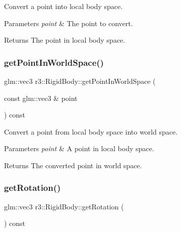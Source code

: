 Convert a point into local body space. 


\begin{DoxyParams}{Parameters}
{\em point} & The point to convert. \\
\hline
\end{DoxyParams}
\begin{DoxyReturn}{Returns}
The point in local body space. 
\end{DoxyReturn}
\mbox{\label{classr3_1_1_rigid_body_a1d694ab55e5846af2d5a184b2be4c523}} 
\subsubsection{\texorpdfstring{get\+Point\+In\+World\+Space()}{getPointInWorldSpace()}}
{\footnotesize\ttfamily glm\+::vec3 r3\+::\+Rigid\+Body\+::get\+Point\+In\+World\+Space (\begin{DoxyParamCaption}\item[{const glm\+::vec3 \&}]{point }\end{DoxyParamCaption}) const}



Convert a point from local body space into world space. 


\begin{DoxyParams}{Parameters}
{\em point} & A point in local body space. \\
\hline
\end{DoxyParams}
\begin{DoxyReturn}{Returns}
The converted point in world space. 
\end{DoxyReturn}
\mbox{\label{classr3_1_1_rigid_body_afd8accdd3c9a75053eaeac0c9c35d07d}} 
\subsubsection{\texorpdfstring{get\+Rotation()}{getRotation()}}
{\footnotesize\ttfamily glm\+::vec3 r3\+::\+Rigid\+Body\+::get\+Rotation (\begin{DoxyParamCaption}{ }\end{DoxyParamCaption}) const}



